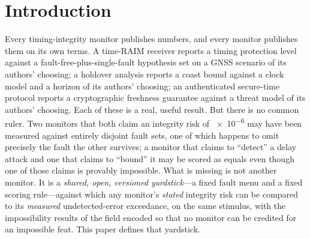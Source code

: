 \section{Introduction}
\label{sec:intro}

Every timing-integrity monitor publishes numbers, and every monitor publishes
them on its own terms. A time-RAIM receiver reports a timing protection level
against a fault-free-plus-single-fault hypothesis set on a GNSS scenario of its
authors' choosing; a holdover analysis reports a coast bound against a clock model
and a horizon of its authors' choosing; an authenticated secure-time protocol
reports a cryptographic freshness guarantee against a threat model of its authors'
choosing. Each of these is a real, useful result. But there is no common ruler.
Two monitors that both claim an integrity risk of \num{e-6} may have been measured
against entirely disjoint fault sets, one of which happens to omit precisely the
fault the other survives; a monitor that claims to ``detect'' a delay attack and
one that claims to ``bound'' it may be scored as equals even though one of those
claims is provably impossible. What is missing is not another monitor. It is a
\emph{shared, open, versioned yardstick}---a fixed fault menu and a fixed scoring
rule---against which any monitor's \emph{stated} integrity risk can be compared to
its \emph{measured} undetected-error exceedance, on the same stimulus, with the
impossibility results of the field encoded so that no monitor can be credited for
an impossible feat. This paper defines that yardstick.

